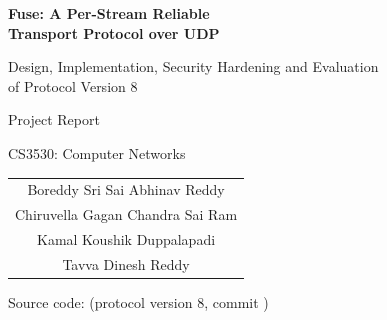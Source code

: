 \documentclass[11pt,a4paper,oneside]{report}
\begin{document}
\begin{titlepage}
  \centering
  \vspace*{3cm}
  {\Huge\bfseries Fuse: A Per-Stream Reliable\\[4pt] Transport Protocol over UDP\par}
  \vspace{0.8cm}
  {\Large Design, Implementation, Security Hardening and Evaluation\\ of Protocol Version 8\par}
  \vspace{2.2cm}
  {\large Project Report\par}
  \vspace{0.4cm}
  {\large CS3530: Computer Networks\par}
  \vspace{2.2cm}
  {\large
  \begin{tabular}{c}
    Boreddy Sri Sai Abhinav Reddy\\[3pt]
    Chiruvella Gagan Chandra Sai Ram\\[3pt]
    Kamal Koushik Duppalapadi\\[3pt]
    Tavva Dinesh Reddy
  \end{tabular}\par}
  \vfill
  {\small Source code:  (protocol version 8, commit )\par}
\end{titlepage}
\end{document}
